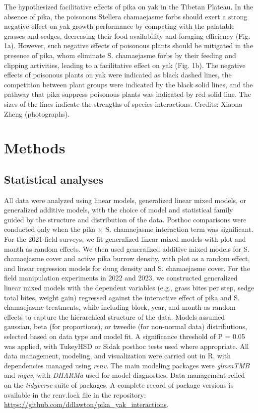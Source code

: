 \documentclass[
  letterpaper,
  DIV=11,
  numbers=noendperiod]{scrartcl}
\begin{document}
\begin{fig}
{}

\caption{\label{fig-hypothesis}The hypothesized facilitative effects of
pika on yak in the Tibetan Plateau. In the absence of pika, the
poisonous Stellera chamaejasme forbs should exert a strong negative
effect on yak growth performance by competing with the palatable grasses
and sedges, decreasing their food availability and foraging efficiency
(Fig. 1a). However, such negative effects of poisonous plants should be
mitigated in the presence of pika, whom eliminate S. chamaejasme forbs
by their feeding and clipping activities, leading to a facilitative
effect on yak (Fig. 1b). The negative effects of poisonous plants on yak
were indicated as black dashed lines, the competition between plant
groups were indicated by the black solid lines, and the pathway that
pika suppress poisonous plants was indicated by red solid line. The
sizes of the lines indicate the strengths of species interactions.
Credits: Xiaona Zheng (photographs).}

\end{fig}%

\section{Methods}\label{methods}

\subsection{Statistical analyses}\label{statistical-analyses}

All data were analyzed using linear models, generalized linear mixed
models, or generalized additive models, with the choice of model and
statistical family guided by the structure and distribution of the data.
Posthoc comparisons were conducted only when the pika × S. chamaejasme
interaction term was significant. For the 2021 field surveys, we fit
generalized linear mixed models with plot and month as random effects.
We then used generalized additive mixed models for S. chamaejasme cover
and active pika burrow density, with plot as a random effect, and linear
regression models for dung density and S. chamaejasme cover. For the
field manipulation experiments in 2022 and 2023, we constructed
generalized linear mixed models with the dependent variables (e.g.,
grass bites per step, sedge total bites, weight gain) regressed against
the interactive effect of pika and S. chamaejasme treatments, while
including block, year, and month as random effects to capture the
hierarchical structure of the data. Models assumed gaussian, beta (for
proportions), or tweedie (for non-normal data) distributions, selected
based on data type and model fit. A significance threshold of P = 0.05
was applied, with TukeyHSD or Sidak posthoc tests used where
appropriate. All data management, modeling, and visualization were
carried out in R, with dependencies managed using \emph{renv}. The main
modeling packages were \emph{glmmTMB} and \emph{mgcv}, with
\emph{DHARMa} used for model diagnostics. Data management relied on the
\emph{tidyverse} suite of packages. A complete record of package
versions is available in the renv.lock file in the repository:
\url{https://github.com/ddlawton/pika_yak_interactions}.
\end{document}
